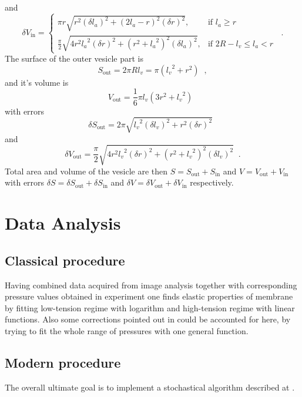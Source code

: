 and
\begin{equation*}
\delta V_{\text{in}} = \left\{
\begin{array}{ll}
	\pi r \sqrt{r^2\left(\delta l_a\right)^2 + \left(2l_a-r\right)^2 \left(\delta r\right)^2}, & \text{if } l_a \geq r\\
	\frac{\pi}{2} \sqrt{4 r^2 {l_a}^2\left(\delta r\right)^2 + \left(r^2+{l_a}^2\right)^2 \left(\delta l_a\right)^2}, & \text{if } 2R-l_v \leq l_a < r
\end{array}
\right.\;\;.
\end{equation*}
The surface of the outer vesicle part is
\begin{equation*}
S_\text{out} = 2\pi Rl_v = \pi \left({l_v}^2+r^2\right)\;\;,
\end{equation*}
and it's volume is
\begin{equation*}
V_\text{out} = \frac{1}{6}\pi l_v\left(3r^2+{l_v}^2\right)\;\;
\end{equation*}
with errors
\begin{equation*}
\delta S_\text{out} = 2\pi\sqrt{{l_v}^2 \left(\delta l_v\right)^2 + r^2 \left( \delta r\right) ^2}\;\;
\end{equation*}
and
\begin{equation*}
\delta V_\text{out} = \frac{\pi}{2} \sqrt{4 r^2 {l_v}^2\left(\delta r\right)^2 + \left(r^2+{l_v}^2\right)^2 \left(\delta l_v\right)^2}\;\;.
\end{equation*}
Total area and volume of the vesicle are then $S = S_\text{out}+S_\text{in}$ and $V = V_\text{out}+V_\text{in}$ with errors $\delta S = \delta S_\text{out} + \delta S_\text{in}$ and $\delta V = \delta V_\text{out} + \delta V_\text{in}$ respectively.

\section{Data Analysis}\label{analysis}
\subsection{Classical procedure}
Having combined data acquired from image analysis together with corresponding pressure values obtained in experiment one finds elastic properties of membrane by fitting low-tension regime with logarithm and high-tension regime with linear functions. Also some corrections pointed out in \cite{Henriksen2004, Fournier2001} could be accounted for here, by trying to fit the whole range of pressures with one general function.

\subsection{Modern procedure}
The overall ultimate goal is to implement a stochastical algorithm described at \cite{Henriksen2004}.


